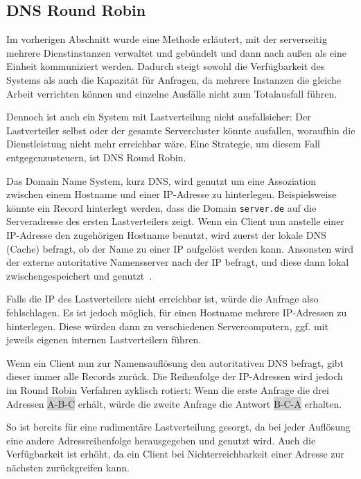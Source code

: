 \subsection{DNS Round Robin}
Im vorherigen Abschnitt wurde eine Methode erläutert, mit der serverseitig mehrere Dienstinstanzen verwaltet und gebündelt und dann nach außen als eine Einheit kommuniziert werden.
Dadurch steigt sowohl die Verfügbarkeit des Systems als auch die Kapazität für Anfragen, da mehrere Instanzen die gleiche Arbeit verrichten können und einzelne Ausfälle nicht zum Totalausfall führen.

Dennoch ist auch ein System mit Lastverteilung nicht ausfallsicher:
Der Lastverteiler selbst oder der gesamte Servercluster könnte ausfallen, woraufhin die Dienstleistung nicht mehr erreichbar wäre.
Eine Strategie, um diesem Fall entgegenzusteuern, ist DNS Round Robin.

Das Domain Name System, kurz DNS, wird genutzt um eine Assoziation zwischen einem Hostname und einer IP-Adresse zu hinterlegen.
Beispielsweise könnte ein Record hinterlegt werden, dass die Domain \verb|server.de| auf die Serveradresse des ersten Lastverteilers zeigt.
Wenn ein Client nun anstelle einer IP-Adresse den zugehörigen Hostname benutzt, wird zuerst der lokale DNS (Cache) befragt, ob der Name zu einer IP aufgelöst werden kann.
Ansonsten wird der externe autoritative Namensserver nach der IP befragt, und diese dann lokal zwischengespeichert und genutzt~\cite{Kopparapu.2002}.

Falls die IP des Lastverteilers nicht erreichbar ist, würde die Anfrage also fehlschlagen.
Es ist jedoch möglich, für einen Hostname mehrere IP-Adressen zu hinterlegen.
Diese würden dann zu verschiedenen Servercomputern, ggf. mit jeweils eigenen internen Lastverteilern führen.

Wenn ein Client nun zur Namensauflösung den autoritativen DNS befragt, gibt dieser immer alle Records zurück.
Die Reihenfolge der IP-Adressen wird jedoch im Round Robin Verfahren zyklisch rotiert:
Wenn die erste Anfrage die drei Adressen \colorbox{lightgray}{A-B-C} erhält, würde die zweite Anfrage die Antwort \colorbox{lightgray}{B-C-A} erhalten.

So ist bereits für eine rudimentäre Lastverteilung gesorgt, da bei jeder Auflösung eine andere Adressreihenfolge herausgegeben und genutzt wird.
Auch die Verfügbarkeit ist erhöht, da ein Client bei Nichterreichbarkeit einer Adresse zur nächsten zurückgreifen kann.

